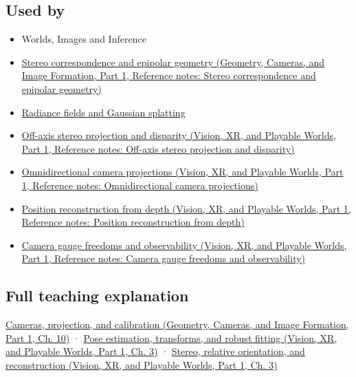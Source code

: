 \subsection{Used by}\label{appendix-3ee9861904d5-used-by}

\hypertarget{appendix-3ee9861904d5-used-by}{}

\begin{itemize}
\item
  {Worlds, Images and Inference}
\item
  \href{../03-Geometry-Cameras-and-Image-Formation-P01/main.pdf\#appendix-c4e98b6e4001}{Stereo correspondence and epipolar geometry (Geometry, Cameras, and Image Formation, Part 1, Reference notes: Stereo correspondence and epipolar geometry)}
\item
  \hyperref[appendix-c5b332e400e7]{Radiance fields and Gaussian splatting}
\item
  \href{../07-Vision-XR-and-Playable-Worlds-P01/main.pdf\#appendix-0976e86e5b9f}{Off-axis stereo projection and disparity (Vision, XR, and Playable Worlds, Part 1, Reference notes: Off-axis stereo projection and disparity)}
\item
  \href{../07-Vision-XR-and-Playable-Worlds-P01/main.pdf\#appendix-fc99ad39f351}{Omnidirectional camera projections (Vision, XR, and Playable Worlds, Part 1, Reference notes: Omnidirectional camera projections)}
\item
  \href{../07-Vision-XR-and-Playable-Worlds-P01/main.pdf\#appendix-2cbf2968e866}{Position reconstruction from depth (Vision, XR, and Playable Worlds, Part 1, Reference notes: Position reconstruction from depth)}
\item
  \href{../07-Vision-XR-and-Playable-Worlds-P01/main.pdf\#appendix-113f0267e5f4}{Camera gauge freedoms and observability (Vision, XR, and Playable Worlds, Part 1, Reference notes: Camera gauge freedoms and observability)}
\end{itemize}

\subsection{Full teaching explanation}\label{appendix-3ee9861904d5-full-teaching-explanation}

\hypertarget{appendix-3ee9861904d5-full-teaching-explanation}{}

\href{../03-Geometry-Cameras-and-Image-Formation-P01/main.pdf\#03-visual-computing-i-ch003-cameras-projection-and-calibration}{Cameras, projection, and calibration (Geometry, Cameras, and Image Formation, Part 1, Ch. 10)} · \href{../07-Vision-XR-and-Playable-Worlds-P01/main.pdf\#04-visual-computing-ii-ch032-pose-estimation-transforms-and-robust-fitting}{Pose estimation, transforms, and robust fitting (Vision, XR, and Playable Worlds, Part 1, Ch. 3)} · \href{../07-Vision-XR-and-Playable-Worlds-P01/main.pdf\#04-visual-computing-ii-ch032-stereo-relative-orientation-and-reconstruction}{Stereo, relative orientation, and reconstruction (Vision, XR, and Playable Worlds, Part 1, Ch. 3)}

